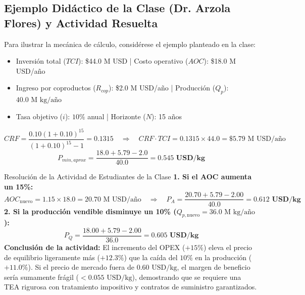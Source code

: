 \documentclass[11pt,letterpaper]{article}
\begin{document}
\subsection{Ejemplo Didáctico de la Clase (Dr. Arzola Flores) y Actividad Resuelta}
Para ilustrar la mecánica de cálculo, considérese el ejemplo planteado en la clase:
\begin{itemize}
    \item Inversión total ($TCI$): \$44.0 M USD | Costo operativo ($AOC$): \$18.0 M USD/año
    \item Ingreso por coproductos ($R_{cop}$): \$2.0 M USD/año | Producción ($Q_p$): $40.0\text{ M kg/año}$
    \item Tasa objetivo ($i$): $10\%$ anual | Horizonte ($N$): 15 años
\end{itemize}
\begin{equation}
    CRF = \frac{0.10(1 + 0.10)^{15}}{(1 + 0.10)^{15} - 1} = 0.1315 \quad \Longrightarrow \quad CRF \cdot TCI = 0.1315 \times 44.0 = \$5.79\text{ M USD/año}
\end{equation}
\begin{equation}
    P_{min,aprox} = \frac{18.0 + 5.79 - 2.0}{40.0} = \mathbf{0.545\text{ USD/kg}}
\end{equation}

\begin{academicbox}{Resolución de la Actividad de Estudiantes de la Clase}
\textbf{1. Si el AOC aumenta un 15\%:}
\begin{equation}
    AOC_{\text{nuevo}} = 1.15 \times 18.0 = 20.70\text{ M USD/año} \quad \Longrightarrow \quad P_A = \frac{20.70 + 5.79 - 2.00}{40.0} = \mathbf{0.612\text{ USD/kg}}
\end{equation}
\textbf{2. Si la producción vendible disminuye un 10\% ($Q_{p,\text{nuevo}} = 36.0\text{ M kg/año}$):}
\begin{equation}
    P_Q = \frac{18.00 + 5.79 - 2.00}{36.0} = \mathbf{0.605\text{ USD/kg}}
\end{equation}
\textbf{Conclusión de la actividad:} El incremento del OPEX ($+15\%$) eleva el precio de equilibrio ligeramente más ($+12.3\%$) que la caída del $10\%$ en la producción ($+11.0\%$). Si el precio de mercado fuera de $0.60\text{ USD/kg}$, el margen de beneficio sería sumamente frágil ($< 0.055\text{ USD/kg}$), demostrando que se requiere una TEA rigurosa con tratamiento impositivo y contratos de suministro garantizados.
\end{academicbox}
\end{document}
